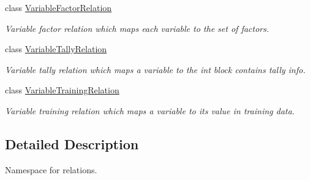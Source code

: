 \begin{DoxyCompactItemize}
class \hyperlink{classmia_1_1elly_1_1dstruct_1_1_variable_factor_relation}{Variable\-Factor\-Relation}
\begin{DoxyCompactList}\small\item\em Variable factor relation which maps each variable to the set of factors. \end{DoxyCompactList}\item 
class \hyperlink{classmia_1_1elly_1_1dstruct_1_1_variable_tally_relation}{Variable\-Tally\-Relation}
\begin{DoxyCompactList}\small\item\em Variable tally relation which maps a variable to the int block contains tally info. \end{DoxyCompactList}\item 
class \hyperlink{classmia_1_1elly_1_1dstruct_1_1_variable_training_relation}{Variable\-Training\-Relation}
\begin{DoxyCompactList}\small\item\em Variable training relation which maps a variable to its value in training data. \end{DoxyCompactList}\end{DoxyCompactItemize}


\subsection{Detailed Description}
Namespace for relations. 